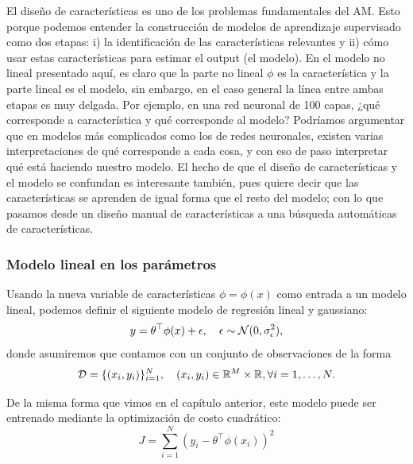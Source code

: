 \begin{mdframed}[style=discusion, frametitle={\center Características y modelos}]
El diseño de características es uno de los problemas fundamentales del AM. Esto porque podemos entender la construcción de modelos de aprendizaje supervisado como dos etapas: i) la identificación de las características relevantes y ii) cómo usar estas características para estimar el output (el modelo). En el modelo no lineal presentado aquí, es claro que la parte no lineal $\phi$ es la característica y la parte lineal es el modelo, sin embargo, en el caso general la línea entre ambas etapas es muy delgada.  Por ejemplo, en una red neuronal de 100 capas, ¿qué corresponde a característica y qué corresponde al modelo? Podríamos argumentar que en modelos más complicados como los de redes neuronales, existen varias interpretaciones de qué corresponde a cada cosa, y con eso de paso interpretar qué está haciendo nuestro modelo. El hecho de que el diseño de características y el modelo se confundan es interesante también, pues quiere decir que las características se aprenden de igual forma que el resto del modelo; con lo que pasamos desde un diseño manual de características a una búsqueda automáticas de características. 

\end{mdframed}


\subsubsection{Modelo lineal en los parámetros} 
\label{sub:modelo_lineal_param}


Usando la nueva variable de  características $\phi=\phi(x)$ como entrada a un modelo lineal, podemos definir el siguiente modelo de regresión lineal y gaussiano: 
\begin{equation}
    y = \theta^\top\phi(x) + \epsilon,\quad \epsilon\sim{\mathcal N}(0,\sigma_\epsilon^2)\label{eq:reg_no_lin},
\end{equation}
donde asumiremos que contamos con un conjunto de observaciones de la forma
\begin{equation}
    {\mathcal D} = \{(x_i,y_i)\}_{i=1}^N,\quad (x_i, y_i)\in\mathbb{R}^M\times\mathbb{R},\forall i=1,\ldots,N.
    \label{eq:training_set_nl}
\end{equation}

De la misma forma que vimos en el capítulo anterior, este modelo puede ser entrenado mediante la optimización de costo cuadrático:
\begin{equation}
	J = \sum_{i=1}^N(y_i - \theta^\top\phi(x_i))^2
	\end{equation}

